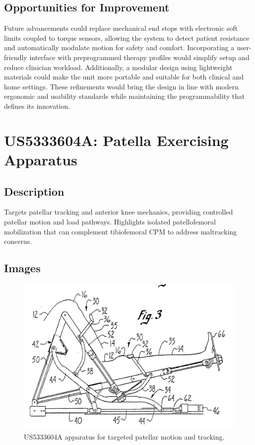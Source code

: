 \documentclass[11pt]{article}
\begin{document}
\subsection{Opportunities for Improvement}
Future advancements could replace mechanical end stops with electronic soft limits coupled to torque sensors, allowing the system to detect patient resistance and automatically modulate motion for safety and comfort. Incorporating a user-friendly interface with preprogrammed therapy profiles would simplify setup and reduce clinician workload. Additionally, a modular design using lightweight materials could make the unit more portable and suitable for both clinical and home settings. These refinements would bring the design in line with modern ergonomic and usability standards while maintaining the programmability that defines its innovation.

\section{US5333604A: Patella Exercising Apparatus}
\subsection{Description}
Targets patellar tracking and anterior knee mechanics, providing controlled patellar motion and load pathways. Highlights isolated patellofemoral mobilization that can complement tibiofemoral CPM to address maltracking concerns.
\subsection{Images}
\begin{figure}[H]
  \centering
  \includegraphics[width=0.54\linewidth]{US5333604_1.png}
  \caption{US5333604A apparatus for targeted patellar motion and tracking.}
  \label{fig:US5333604A}
\end{figure}
\end{document}
